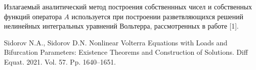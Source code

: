 Излагаемый аналитический метод построения собственнных чисел и собственных функций оператора $A$ используется при построении разветвляющихся решений нелинейных интегральных уравнений Вольтерра, рассмотренных в работе [1].




\begin{thebibliography}{99}
Sidorov N.A., Sidorov D.N.  {  Nonlinear Volterra Equations with Loads and Bifurcation Parameters: Existence Theorems and Construction of Solutions.} Diff Equat. 2021.  Vol. 57. Pp. 1640--1651.

\end{thebibliography}






%

